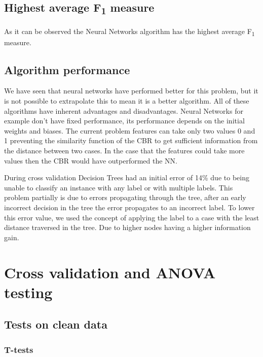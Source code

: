 \documentclass[a4paper,11pt]{article}
\begin{document}
\subsection{Highest average F\textsubscript{1} measure}
As it can be observed the Neural Networks algorithm has the highest average F\textsubscript{1} measure. 

\subsection{Algorithm performance}
We have seen that neural networks have performed better for this problem, but
it is not possible to extrapolate this to mean it is a better algorithm. All of
these algorithms have inherent advantages and disadvantages. Neural Networks
for example don’t have fixed performance, its performance depends on the
initial weights and biases. The current problem features can take only two
values 0 and 1 preventing the similarity function of the CBR to get
sufficient information from the distance between two cases. In the case
that the features could take more values then the CBR would have outperformed the NN.

During cross validation Decision Trees had an initial error of 14\% due to
being unable to classify an instance with any label or with multiple
labels. This problem partially is due to errors propagating through the
tree, after an early incorrect decision in the tree the error propagates to
an incorrect label. To lower this error value, we used the concept of
applying the label to a case with the least distance traversed in the tree.
Due to higher nodes having a higher information gain.

\section{Cross validation and ANOVA testing}

\subsection{Tests on clean data}

\subsubsection{T-tests}
\end{document}
